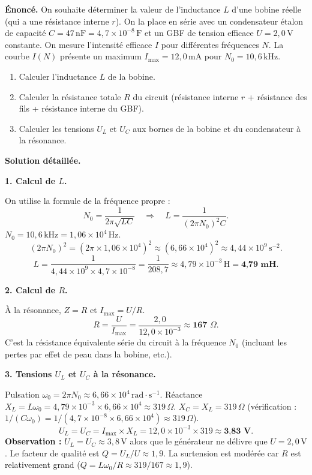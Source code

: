 \documentclass[11pt]{article}
\begin{document}
\begin{exoresolu}
\textbf{Énoncé.} On souhaite déterminer la valeur de l'inductance $L$ d'une bobine réelle (qui a une résistance interne $r$). On la place en série avec un condensateur étalon de capacité $C = 47\,\text{nF} = 4,7 \times 10^{-8}\,\text{F}$ et un GBF de tension efficace $U = 2,0\,\text{V}$ constante. On mesure l'intensité efficace $I$ pour différentes fréquences $N$. La courbe $I(N)$ présente un maximum $I_{\max} = 12,0\,\text{mA}$ pour $N_0 = 10,6\,\text{kHz}$.
\begin{enumerate}
    \item Calculer l'inductance $L$ de la bobine.
    \item Calculer la résistance totale $R$ du circuit (résistance interne $r$ + résistance des fils + résistance interne du GBF).
    \item Calculer les tensions $U_L$ et $U_C$ aux bornes de la bobine et du condensateur à la résonance.
\end{enumerate}
\tcblower
\textbf{Solution détaillée.}

\textbf{1. Calcul de $L$.}\par
On utilise la formule de la fréquence propre :
\[
N_0 = \frac{1}{2\pi\sqrt{LC}} \quad \Rightarrow \quad L = \frac{1}{(2\pi N_0)^2 C}.
\]
$N_0 = 10,6\,\text{kHz} = 1,06 \times 10^4\,\text{Hz}$.
\[
(2\pi N_0)^2 = (2\pi \times 1,06 \times 10^4)^2 \approx (6,66 \times 10^4)^2 \approx 4,44 \times 10^9\,\text{s}^{-2}.
\]
\[
L = \frac{1}{4,44 \times 10^9 \times 4,7 \times 10^{-8}} = \frac{1}{208,7} \approx 4,79 \times 10^{-3}\,\text{H} = \textbf{4,79 mH}.
\]

\textbf{2. Calcul de $R$.}\par
À la résonance, $Z = R$ et $I_{\max} = U/R$.
\[
R = \frac{U}{I_{\max}} = \frac{2,0}{12,0 \times 10^{-3}} \approx \textbf{167 }\Omega.
\]
C'est la résistance équivalente série du circuit à la fréquence $N_0$ (incluant les pertes par effet de peau dans la bobine, etc.).

\textbf{3. Tensions $U_L$ et $U_C$ à la résonance.}\par
Pulsation $\omega_0 = 2\pi N_0 \approx 6,66 \times 10^4\,\text{rad}\cdot\text{s}^{-1}$.
Réactance $X_L = L\omega_0 = 4,79 \times 10^{-3} \times 6,66 \times 10^4 \approx 319\,\Omega$.
$X_C = X_L = 319\,\Omega$ (vérification : $1/(C\omega_0) = 1/(4,7\times10^{-8} \times 6,66\times10^4) \approx 319\,\Omega$).
\[
U_L = U_C = I_{\max} \times X_L = 12,0 \times 10^{-3} \times 319 \approx \textbf{3,83 V}.
\]
\textbf{Observation :} $U_L = U_C \approx 3,8\,\text{V}$ alors que le générateur ne délivre que $U = 2,0\,\text{V}$. Le facteur de qualité est $Q = U_L/U \approx 1,9$. La surtension est modérée car $R$ est relativement grand ($Q = L\omega_0/R \approx 319/167 \approx 1,9$).
\end{exoresolu}
\end{document}
